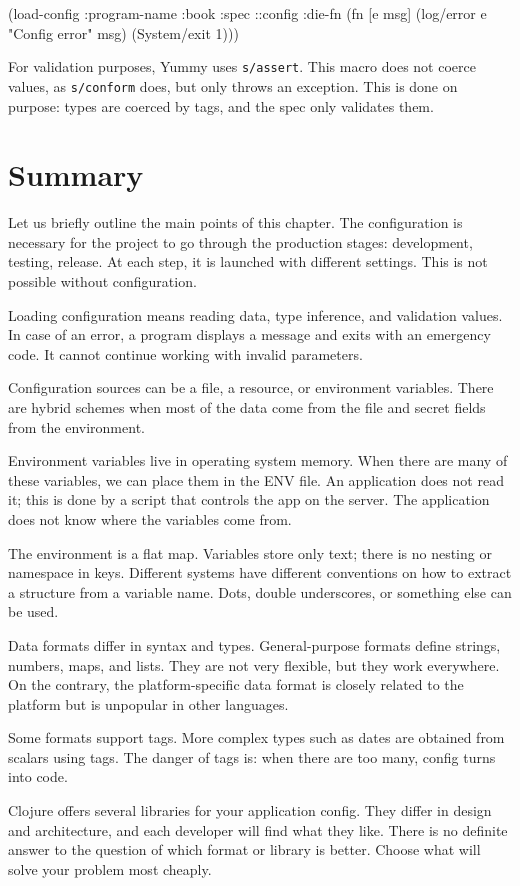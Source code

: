 \else

\begin{clojure}
(load-config
 {:program-name :book
  :spec ::config
  :die-fn (fn [e msg]
            (log/error e "Config error" msg)
            (System/exit 1))})
\end{clojure}

\fi

For validation purposes, Yummy uses \verb|s/assert|. This macro does not coerce values, as \verb|s/conform| does, but only throws an exception. This is done on purpose: types are coerced by tags, and the spec only validates them.

\section{Summary}

Let us briefly outline the main points of this chapter. The configuration is necessary for the project to go through the production stages: development, testing, release. At each step, it is launched with different settings. This is not possible without configuration.

Loading configuration means reading data, type inference, and validation values. In case of an error, a program displays a message and exits with an emergency code. It cannot continue working with invalid parameters.

Configuration sources can be a file, a resource, or environment variables. There are hybrid schemes when most of the data come from the file and secret fields from the environment.

Environment variables live in operating system memory. When there are many of these variables, we can place them in the ENV file. An application does not read it; this is done by a script that controls the app on the server. The application does not know where the variables come from.

The environment is a flat map. Variables store only text; there is no nesting or namespace in keys. Different systems have different conventions on how to extract a structure from a variable name. Dots, double underscores, or something else can be used.

Data formats differ in syntax and types. General-purpose formats define strings, numbers, maps, and lists. They are not very flexible, but they work everywhere. On the contrary, the platform-specific data format is closely related to the platform but is unpopular in other languages.

Some formats support tags. More complex types such as dates are obtained from scalars using tags. The danger of tags is: when there are too many, config turns into code.

Clojure offers several libraries for your application config. They differ in design and architecture, and each developer will find what they like. There is no definite answer to the question of which format or library is better. Choose what will solve your problem most cheaply.
